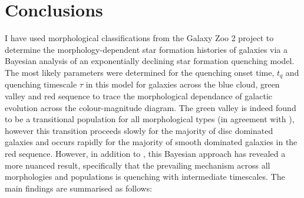 \section{Conclusions}\label{morph:conc}

I have used morphological classifications from the Galaxy Zoo 2 project to determine the morphology-dependent star formation histories of galaxies via a Bayesian analysis of an exponentially declining star formation quenching model. The most likely parameters were determined for the quenching onset time, $t_q$ and quenching timescale $\tau$ in this model for galaxies across the blue cloud, green valley and red sequence to trace the morphological dependance of galactic evolution across the colour-magnitude diagram. The green valley is indeed found to be a transitional population for all morphological types (in agreement with \citet{schawinski14}), however this transition proceeds slowly for the majority of disc dominated galaxies and occurs rapidly for the majority of smooth dominated galaxies in the red sequence. However, in addition to \citet{schawinski14}, this Bayesian approach has revealed a more nuanced result, specifically that the prevailing mechanism across all morphologies and populations is quenching with intermediate timescales. The main findings are summarised as follows:
